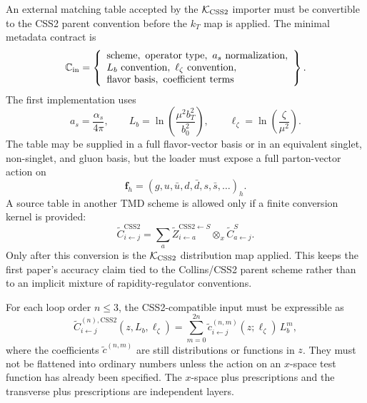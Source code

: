 \documentclass[11pt]{article}
\newcommand{\ox}{\otimes_x}
\newcommand{\KCSS}{\mathcal K_{\rm CSS2}}
\newcommand{\CSS}{\mathrm{CSS2}}
\begin{document}
An external matching table accepted by the $\KCSS$ importer must be convertible to the
CSS2 parent convention before the $k_T$ map is applied.  The minimal metadata contract is
\begin{equation}
  \mathbb C_{\rm in}=
  \left\{
  \begin{array}{l}
  \text{scheme},\ \text{operator type},\ a_s\text{ normalization},\\
  L_b\text{ convention},\ \ell_\zeta\text{ convention},\\
  \text{flavor basis},\ \text{coefficient terms}
  \end{array}
  \right\} .
  \label{eq:n3lo-import-metadata-v14}
\end{equation}
The first implementation uses
\begin{equation}
  a_s=\frac{\alpha_s}{4\pi},
  \qquad
  L_b=\ln\!\left(\frac{\mu^2 b_T^2}{b_0^2}\right),
  \qquad
  \ell_\zeta=\ln\!\left(\frac{\zeta}{\mu^2}\right).
  \label{eq:n3lo-import-conventions-v14}
\end{equation}
The table may be supplied in a full flavor-vector basis or in an equivalent singlet,
non-singlet, and gluon basis, but the loader must expose a full parton-vector action on
\begin{equation}
  \mathbf f_h=(g,u,\bar u,d,\bar d,s,\bar s,\ldots)_h .
  \label{eq:n3lo-flavor-vector-v14}
\end{equation}
A source table in another TMD scheme is allowed only if a finite conversion kernel is
provided:
\begin{equation}
  \widetilde C_{i\leftarrow j}^{\CSS}
  =
  \sum_{a}
  \widetilde Z_{i\leftarrow a}^{\CSS\leftarrow S}
  \ox
  \widetilde C_{a\leftarrow j}^{S} .
  \label{eq:n3lo-scheme-convert-v14}
\end{equation}
Only after this conversion is the $\KCSS$ distribution map applied.  This keeps the first
paper's accuracy claim tied to the Collins/CSS2 parent scheme rather than to an implicit
mixture of rapidity-regulator conventions.

For each loop order $n\le3$, the CSS2-compatible input must be expressible as
\begin{equation}
  \widetilde C_{i\leftarrow j}^{(n),\CSS}(z,L_b,\ell_\zeta)
  =
  \sum_{m=0}^{2n}
  \widetilde c_{i\leftarrow j}^{(n,m)}(z;\ell_\zeta)\,L_b^m,
  \label{eq:n3lo-C-polynomial-v14}
\end{equation}
where the coefficients \(\widetilde c^{(n,m)}\) are still distributions or functions in
\(z\).  They must not be flattened into ordinary numbers unless the action on an
$x$-space test function has already been specified.  The $x$-space plus prescriptions and
the transverse plus prescriptions are independent layers.
\end{document}
